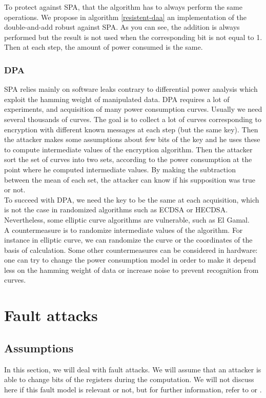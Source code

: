 \documentclass[journal]{IEEEtran}
\begin{document}
To protect against SPA, that the algorithm has to always perform the same operations. We propose in algorithm \ref{resistent-daa} an implementation of the double-and-add robust against SPA.
As you can see, the addition is always performed but the result is not used when the corresponding bit is not equal to 1. Then at each step, the amount of power consumed is the same.\\

        \subsubsection{DPA}

SPA relies mainly on software leaks contrary to differential power analysis which exploit the hamming weight of manipulated data. DPA requires a lot of experiments, and acquisition of many power consumption curves. Usually we need several thousands of curves. The goal is to collect a lot of curves corresponding to encryption with different known messages at each step (but the same key). Then the attacker makes some assumptions about few bits of the key and he uses these to compute intermediate values of the encryption algorithm. Then the attacker sort the set of curves into two sets, according to the power consumption at the point where he computed intermediate values. By making the subtraction between the mean of each set, the attacker can know if his supposition was true or not. \\

To succeed with DPA, we need the key to be the same at each acquisition, which is not the case in randomized algorithms such as ECDSA or HECDSA. Nevertheless, some elliptic curve algorithms are vulnerable, such as El Gamal.\\

A countermeasure is to randomize intermediate values of the algorithm. For instance in elliptic curve, we can randomize the curve or the coordinates of the basis of calculation. Some other countermeasures can be considered in hardware: 
one can try to change the power consumption model in order to make it depend less on the hamming weight of data or increase noise to prevent recognition from curves.
        
\section{Fault attacks}
\label{fault}

\subsection{Assumptions}
In this section, we will deal with fault attacks. We will assume that an attacker is able to change bits of the registers
during the computation. We will not discuss here if this fault model is relevant or not, but for further information, 
refer to \cite{bar2006sorcerer} or \cite{giraud2004survey}.
\end{document}
